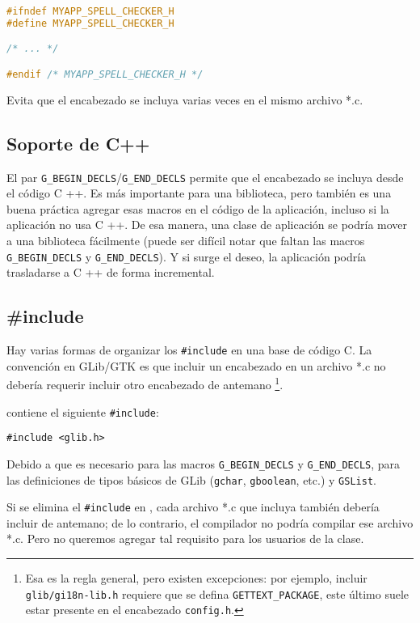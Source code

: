 \begin{lstlisting}[language=C]
#ifndef MYAPP_SPELL_CHECKER_H
#define MYAPP_SPELL_CHECKER_H

/* ... */

#endif /* MYAPP_SPELL_CHECKER_H */
\end{lstlisting}

Evita que el encabezado se incluya varias veces en el mismo archivo *.c.

\subsection{Soporte de C++}
El par \lstinline{G_BEGIN_DECLS}/\lstinline{G_END_DECLS} permite que el encabezado se incluya desde el código C ++. Es más importante para una biblioteca, pero también es una buena práctica agregar esas macros en el código de la aplicación, incluso si la aplicación no usa C ++. De esa manera, una clase de aplicación se podría mover a una biblioteca fácilmente (puede ser difícil notar que faltan las macros \lstinline{G_BEGIN_DECLS} y \lstinline{G_END_DECLS}). Y si surge el deseo, la aplicación podría trasladarse a C ++ de forma incremental.

\subsection{\#include}
\label{oop-semi-include-in-header}
Hay varias formas de organizar los \lstinline{#include} en una base de código C. La convención en GLib/GTK es que incluir un encabezado en un archivo *.c no debería requerir incluir otro encabezado de antemano \footnote{Esa es la regla general, pero existen excepciones: por ejemplo, incluir \lstinline{glib/gi18n-lib.h} requiere que se defina \lstinline{GETTEXT_PACKAGE}, este último suele estar presente en el encabezado \lstinline{config.h}.}.

 contiene el siguiente \lstinline{#include}:
\begin{lstlisting}
#include <glib.h>
\end{lstlisting}

Debido a que  es necesario para las macros \lstinline{G_BEGIN_DECLS} y \lstinline{G_END_DECLS}, para las definiciones de tipos básicos de GLib (\lstinline{gchar}, \lstinline{gboolean}, etc.) y \lstinline{GSList}.

Si se elimina el \lstinline{#include} en , cada archivo *.c que incluya  también debería incluir  de antemano; de lo contrario, el compilador no podría compilar ese archivo *.c. Pero no queremos agregar tal requisito para los usuarios de la clase.

